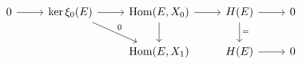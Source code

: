 \documentclass[12pt]{standalone}
\begin{document}
        $$

\begin{tikzcd}
0 \ar[r] & \ker \xi_0(E) \ar[r] \ar[rd,"0"] & 
\operatorname{Hom}(E,X_0) \ar[r] \ar[d] & H(E)
\ar[d,"="] \ar[r] & 0 \\
& & \operatorname{Hom}(E,X_1) & H(E) \ar[r] & 0 
\end{tikzcd}
        $$
        
\end{document}
